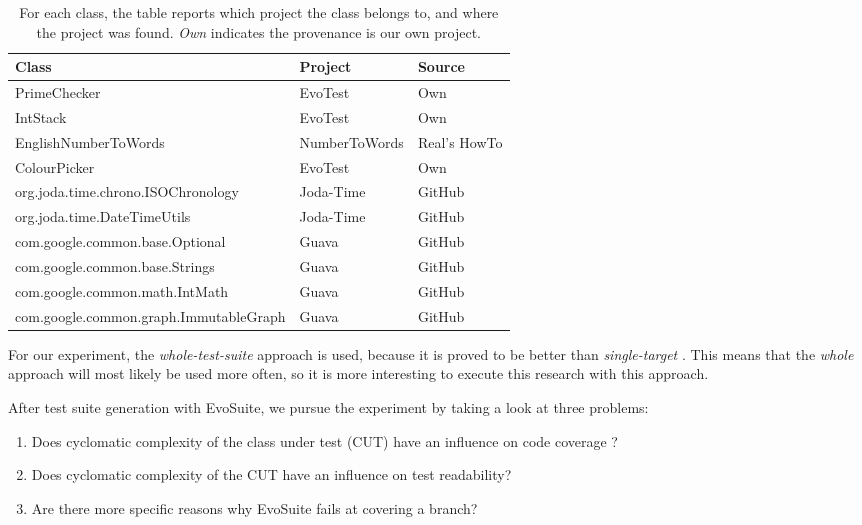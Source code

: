 {\setlength{\extrarowheight}{1ex}
\begin{table}[tbp]
\begin{center}
\small
\begin{tabular}{ m{7cm} p{2.5cm} p{2cm} }
\hline 
Class & Project & Source \\ [0.5ex]
\hline
PrimeChecker & EvoTest & Own \\ [0.5ex] 
IntStack & EvoTest & Own \\ [0.5ex]
EnglishNumberToWords & NumberToWords & Real's HowTo  \\ [0.5ex]
ColourPicker & EvoTest & Own \\ [0.5ex]
org.joda.time.chrono.ISOChronology & Joda-Time & GitHub \\ [0.5ex]
org.joda.time.DateTimeUtils & Joda-Time & GitHub \\ [0.5ex]
com.google.common.base.Optional & Guava & GitHub \\ [0.5ex]
com.google.common.base.Strings & Guava & GitHub \\ [0.5ex]
com.google.common.math.IntMath  & Guava & GitHub \\ [0.5ex]
com.google.common.graph.ImmutableGraph  & Guava & GitHub\\ [0.5ex]
\hline
\end{tabular}
\end{center}
\caption{For each class, the table reports which project the class belongs to, and where the project was found. \textit{Own} indicates the provenance is our own project.}
\label{classes}
\end{table}
}

For our experiment, the \textit{whole-test-suite} approach is used, because it is proved to be better than \textit{single-target} \cite{FRASER2014,FRASER2015}.
This means that the \textit{whole} approach will most likely be used more often, so it is more interesting to execute this research with this approach. 

After test suite generation with EvoSuite, we pursue the experiment by taking a look at three problems:

\begin{enumerate}
\item Does cyclomatic complexity of the class under test (CUT) have an influence on code coverage \cite{CYCLEX}?
\item Does cyclomatic complexity of the CUT have an influence on test readability?
\item Are there more specific reasons why EvoSuite fails at covering a branch?
\end{enumerate}

